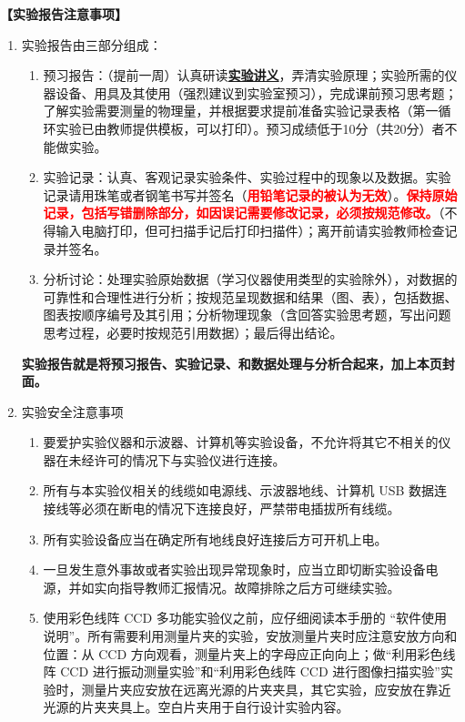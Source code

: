 \documentclass[dvipsnames, svgnames,a4paper,11pt]{article}
\begin{document}
\textbf{【实验报告注意事项】}
\begin{enumerate}
	\item 实验报告由三部分组成：
	\begin{enumerate}
		\item 预习报告：（提前一周）认真研读\underline{\textbf{实验讲义}}，弄清实验原理；实验所需的仪器设备、用具及其使用（强烈建议到实验室预习），完成课前预习思考题；了解实验需要测量的物理量，并根据要求提前准备实验记录表格（第一循环实验已由教师提供模板，可以打印）。预习成绩低于10分（共20分）者不能做实验。
	    \item 实验记录：认真、客观记录实验条件、实验过程中的现象以及数据。实验记录请用珠笔或者钢笔书写并签名（\textcolor{red}{\textbf{用铅笔记录的被认为无效}}）。\textcolor{red}{\textbf{保持原始记录，包括写错删除部分，如因误记需要修改记录，必须按规范修改。}}（不得输入电脑打印，但可扫描手记后打印扫描件）；离开前请实验教师检查记录并签名。
	    \item 分析讨论：处理实验原始数据（学习仪器使用类型的实验除外），对数据的可靠性和合理性进行分析；按规范呈现数据和结果（图、表），包括数据、图表按顺序编号及其引用；分析物理现象（含回答实验思考题，写出问题思考过程，必要时按规范引用数据）；最后得出结论。
	\end{enumerate}
	\textbf{实验报告就是将预习报告、实验记录、和数据处理与分析合起来，加上本页封面。}
	\item 实验安全注意事项
		\begin{enumerate}[label=\roman*.]
			\item 要爱护实验仪器和示波器、计算机等实验设备，不允许将其它不相关的仪器在未经许可的情况下与实验仪进行连接。
			\item 所有与本实验仪相关的线缆如电源线、示波器地线、计算机 USB 数据连接线等必须在断电的情况下连接良好，严禁带电插拔所有线缆。
			\item 所有实验设备应当在确定所有地线良好连接后方可开机上电。
			\item 一旦发生意外事故或者实验出现异常现象时，应当立即切断实验设备电源，并如实向指导教师汇报情况。故障排除之后方可继续实验。
			\item 使用彩色线阵 CCD 多功能实验仪之前，应仔细阅读本手册的 “软件使用说明”。所有需要利用测量片夹的实验，安放测量片夹时应注意安放方向和位置：从 CCD 方向观看，测量片夹上的字母应正向向上；做“利用彩色线阵 CCD 进行振动测量实验”和“利用彩色线阵 CCD 进行图像扫描实验”实验时，测量片夹应安放在远离光源的片夹夹具，其它实验，应安放在靠近光源的片夹夹具上。空白片夹用于自行设计实验内容。
		\end{enumerate}
\end{enumerate}
\end{document}
